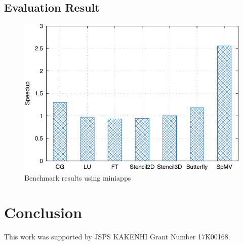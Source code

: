 \documentclass[graybox]{svmult}
\begin{document}
\subsection{Evaluation Result}

\begin{figure}
    \centering
    \includegraphics{benchmark_result}
    \caption{Benchmark results using miniapps}%
    \label{kt:fig:benchmark}
\end{figure}

\section{Conclusion}\label{kt:sec:v}

\begin{acknowledgement}
This work was supported by JSPS KAKENHI Grant Number 17K00168.
\end{acknowledgement}



\end{document}
